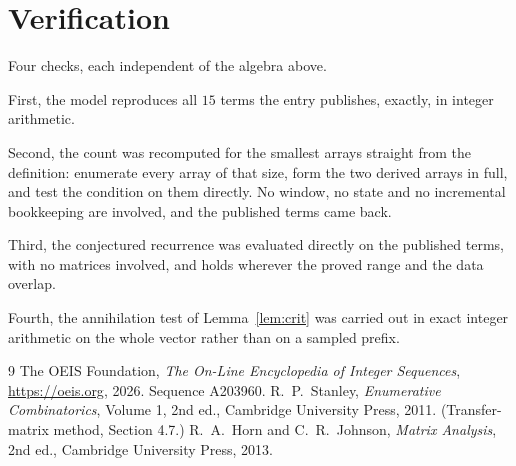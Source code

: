 \documentclass[11pt,a4paper]{article}
\theoremstyle{plain}
\theoremstyle{definition}
\begin{document}
\section{Verification}

Four checks, each independent of the algebra above.

First, the model reproduces all $15$ terms the entry publishes, exactly, in integer
arithmetic.

Second, the count was recomputed for the smallest arrays straight from the definition:
enumerate every array of that size, form the two derived arrays in full, and test the condition
on them directly. No window, no state and no incremental bookkeeping are involved, and the
published terms came back.

Third, the conjectured recurrence was evaluated directly on the published terms, with no
matrices involved, and holds wherever the proved range and the data overlap.

Fourth, the annihilation test of Lemma~\ref{lem:crit} was carried out in exact integer
arithmetic on the whole vector rather than on a sampled prefix.

\begin{thebibliography}{9}
 The OEIS Foundation, \emph{The On-Line Encyclopedia of Integer
Sequences}, \url{https://oeis.org}, 2026. Sequence A203960.
 R.~P.~Stanley, \emph{Enumerative Combinatorics}, Volume 1, 2nd ed.,
Cambridge University Press, 2011. (Transfer-matrix method, Section 4.7.)
 R.~A.~Horn and C.~R.~Johnson, \emph{Matrix Analysis}, 2nd ed., Cambridge
University Press, 2013.
\end{thebibliography}
\end{document}
